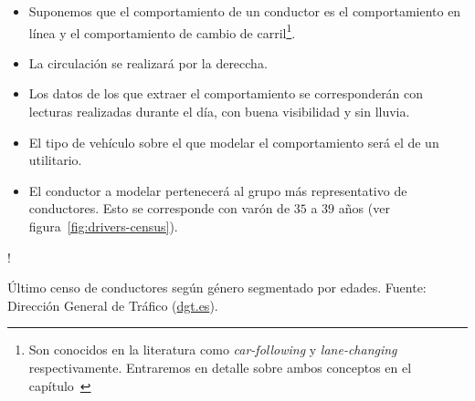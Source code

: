 \begin{itemize}
	\item Suponemos que el comportamiento de un conductor es el comportamiento en línea y el comportamiento de cambio de carril\footnote{Son conocidos en la literatura como \textit{car-following} y \textit{lane-changing} respectivamente. Entraremos en detalle sobre ambos conceptos en el capítulo~}.
	\item La circulación se realizará por la dereccha.
	\item Los datos de los que extraer el comportamiento se corresponderán con lecturas realizadas durante el día, con buena visibilidad y sin lluvia.
	\item El tipo de vehículo sobre el que modelar el comportamiento será el de un utilitario.
	\item El conductor a modelar pertenecerá al grupo más representativo de conductores. Esto se corresponde con varón de $35$ a $39$ años (ver figura~\ref{fig:drivers-census}).
\end{itemize}

\begin{marginfigure}
	\resizebox {\linewidth} {!} {
	}
	\caption{Último censo de conductores según género segmentado por edades. Fuente: Dirección General de Tráfico (\url{dgt.es}).}
	\label{fig:drivers-census}
\end{marginfigure}
